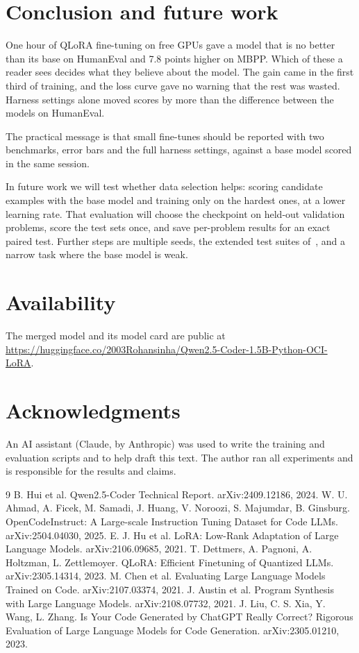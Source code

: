 \documentclass[11pt,a4paper]{article}
\begin{document}
\section{Conclusion and future work}
One hour of QLoRA fine-tuning on free GPUs gave a model that is no better than its base on HumanEval and 7.8 points higher on MBPP. Which of these a reader sees decides what they believe about the model. The gain came in the first third of training, and the loss curve gave no warning that the rest was wasted. Harness settings alone moved scores by more than the difference between the models on HumanEval.

The practical message is that small fine-tunes should be reported with two benchmarks, error bars and the full harness settings, against a base model scored in the same session.

In future work we will test whether data selection helps: scoring candidate examples with the base model and training only on the hardest ones, at a lower learning rate. That evaluation will choose the checkpoint on held-out validation problems, score the test sets once, and save per-problem results for an exact paired test. Further steps are multiple seeds, the extended test suites of~\cite{evalplus}, and a narrow task where the base model is weak.

\section*{Availability}
The merged model and its model card are public at \url{https://huggingface.co/2003Rohansinha/Qwen2.5-Coder-1.5B-Python-OCI-LoRA}.

\section*{Acknowledgments}
An AI assistant (Claude, by Anthropic) was used to write the training and evaluation scripts and to help draft this text. The author ran all experiments and is responsible for the results and claims.

\begin{thebibliography}{9}
 B. Hui et al. Qwen2.5-Coder Technical Report. arXiv:2409.12186, 2024.
 W. U. Ahmad, A. Ficek, M. Samadi, J. Huang, V. Noroozi, S. Majumdar, B. Ginsburg. OpenCodeInstruct: A Large-scale Instruction Tuning Dataset for Code LLMs. arXiv:2504.04030, 2025.
 E. J. Hu et al. LoRA: Low-Rank Adaptation of Large Language Models. arXiv:2106.09685, 2021.
 T. Dettmers, A. Pagnoni, A. Holtzman, L. Zettlemoyer. QLoRA: Efficient Finetuning of Quantized LLMs. arXiv:2305.14314, 2023.
 M. Chen et al. Evaluating Large Language Models Trained on Code. arXiv:2107.03374, 2021.
 J. Austin et al. Program Synthesis with Large Language Models. arXiv:2108.07732, 2021.
 J. Liu, C. S. Xia, Y. Wang, L. Zhang. Is Your Code Generated by ChatGPT Really Correct? Rigorous Evaluation of Large Language Models for Code Generation. arXiv:2305.01210, 2023.
\end{thebibliography}
\end{document}
